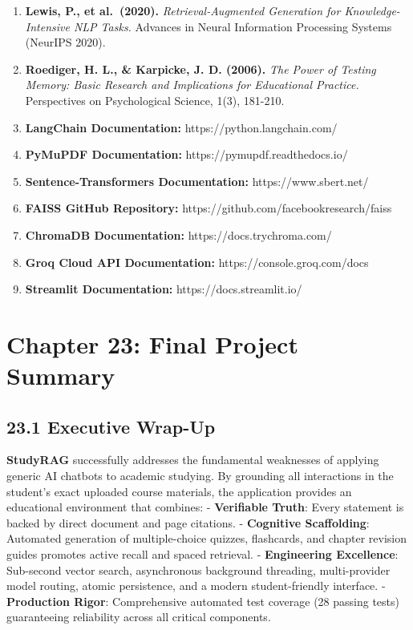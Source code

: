 \documentclass[
]{article}
\providecommand{\tightlist}{%
  \setlength{\itemsep}{0pt}\setlength{\parskip}{0pt}}
\begin{document}
\begin{enumerate}
\def\labelenumi{\arabic{enumi}.}
\tightlist
\item
  \textbf{Lewis, P., et al.~(2020).} \emph{Retrieval-Augmented
  Generation for Knowledge-Intensive NLP Tasks.} Advances in Neural
  Information Processing Systems (NeurIPS 2020).
\item
  \textbf{Roediger, H. L., \& Karpicke, J. D. (2006).} \emph{The Power
  of Testing Memory: Basic Research and Implications for Educational
  Practice.} Perspectives on Psychological Science, 1(3), 181-210.
\item
  \textbf{LangChain Documentation:} https://python.langchain.com/
\item
  \textbf{PyMuPDF Documentation:} https://pymupdf.readthedocs.io/
\item
  \textbf{Sentence-Transformers Documentation:} https://www.sbert.net/
\item
  \textbf{FAISS GitHub Repository:}
  https://github.com/facebookresearch/faiss
\item
  \textbf{ChromaDB Documentation:} https://docs.trychroma.com/
\item
  \textbf{Groq Cloud API Documentation:} https://console.groq.com/docs
\item
  \textbf{Streamlit Documentation:} https://docs.streamlit.io/
\end{enumerate}

\section{Chapter 23: Final Project
Summary}\label{chapter-23-final-project-summary}

\subsection{23.1 Executive Wrap-Up}\label{executive-wrap-up}

\textbf{StudyRAG} successfully addresses the fundamental weaknesses of
applying generic AI chatbots to academic studying. By grounding all
interactions in the student's exact uploaded course materials, the
application provides an educational environment that combines: -
\textbf{Verifiable Truth}: Every statement is backed by direct document
and page citations. - \textbf{Cognitive Scaffolding}: Automated
generation of multiple-choice quizzes, flashcards, and chapter revision
guides promotes active recall and spaced retrieval. -
\textbf{Engineering Excellence}: Sub-second vector search, asynchronous
background threading, multi-provider model routing, atomic persistence,
and a modern student-friendly interface. - \textbf{Production Rigor}:
Comprehensive automated test coverage (28 passing tests) guaranteeing
reliability across all critical components.
\end{document}
